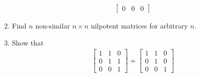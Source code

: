 \documentclass{amsart}
\begin{document}
\begin{enumerate}
\begin{align*}
\begin{bmatrix}
					0 & 0 & 0
			\end{bmatrix}
		\end{align*}
		\item Find $n$ non-similar $n\times n$ nilpotent matrices for arbitrary $n$.
		\item Show that 
		\begin{align*}
			\begin{bmatrix}
					1 & 1 & 0 \\
					0 & 1 & 1 \\
					0 & 0 & 1
			\end{bmatrix}
			\nsim 
			\begin{bmatrix}
					1 & 1 & 0 \\
					0 & 1 & 0 \\
					0 & 0 & 1
			\end{bmatrix}
		\end{align*}
	\end{enumerate}
\end{document}
